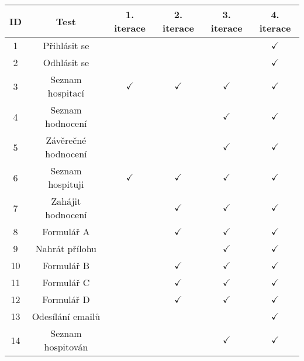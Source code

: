 


\newpage
\begin{table}[h]
\begin{center}
\begin{tabular}{|c|c||c|c|c|c|}
\hline 
\textbf{ID} & \textbf{Test} & \textbf{1. iterace} & \textbf{2. iterace} & \textbf{3. iterace} & \textbf{4. iterace} \\
\hline 
1 & Přihlásit se &  &  &  & $\checkmark$ \\ 
\hline 
2 & Odhlásit se &  &  &  & $\checkmark$ \\ 
\hline 
3 & Seznam hospitací & $\checkmark$ & $\checkmark$ & $\checkmark$ & $\checkmark$ \\ 
\hline 
4 & Seznam hodnocení &  &  & $\checkmark$ & $\checkmark$ \\ 
\hline 
5 & Závěrečné hodnocení &  &  & $\checkmark$ & $\checkmark$ \\ 
\hline 
6 & Seznam hospituji & $\checkmark$ & $\checkmark$ & $\checkmark$ & $\checkmark$ \\ 
\hline 
7 & Zahájit hodnocení &  & $\checkmark$ & $\checkmark$ & $\checkmark$ \\ 
\hline 
8 & Formulář A &  & $\checkmark$ & $\checkmark$ & $\checkmark$ \\ 
\hline 
9 & Nahrát přílohu &  &  & $\checkmark$ & $\checkmark$ \\ 
\hline 
10 & Formulář B &  & $\checkmark$ & $\checkmark$ & $\checkmark$ \\ 
\hline 
11 & Formulář C &  & $\checkmark$ & $\checkmark$ & $\checkmark$ \\ 
\hline 
12 & Formulář D &  & $\checkmark$ & $\checkmark$ & $\checkmark$ \\ 
\hline 
13 & Odesílání emailů &  &  &  & $\checkmark$ \\ 
\hline 
14 & Seznam hospitován &  &  & $\checkmark$ & $\checkmark$ \\ 

\end{tabular}
\end{center}
\end{table}
